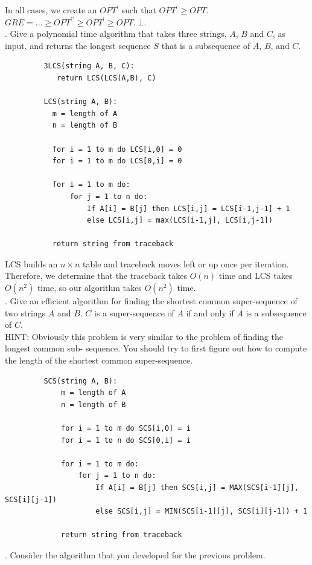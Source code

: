 \documentclass[10pt]{article}
\begin{document}
	In all cases, we create an $OPT^\prime$ such that $OPT^\prime \geq OPT$.\\
	$GRE = \ldots \geq OPT^{\prime\prime} \geq OPT^\prime \geq OPT.~\bot.$
	\\
	
	. Give a polynomial time algorithm that takes three strings, $A$, $B$ and $C$, as input, and returns the
		 longest sequence $S$ that is a subsequence of $A$, $B$, and $C$.\\
		\begin{verbatim}
		 3LCS(string A, B, C):
		    return LCS(LCS(A,B), C)
		
		 LCS(string A, B):
		   m = length of A
		   n = length of B
		
		   for i = 1 to m do LCS[i,0] = 0
		   for i = 1 to m do LCS[0,i] = 0
		   
		   for i = 1 to m do:
		       for j = 1 to n do:
		           If A[i] = B[j] then LCS[i,j] = LCS[i-1,j-1] + 1
		           else LCS[i,j] = max(LCS[i-1,j], LCS[i,j-1])
		            
		   return string from traceback 
		\end{verbatim}
		 LCS builds an $n \times n$ table and traceback moves left or up once per iteration. Therefore, we determine
		 that the traceback takes $O(n)$ time and LCS takes $O(n^2)$ time, so our algorithm takes $O(n^2)$ time.\\ 
		 		 
		 \noindent
		 . Give an efficient algorithm for finding the shortest common super-sequence of two strings $A$ and $B$. $C$
		 is a super-sequence of $A$ if and only if $A$ is a subsequence of $C$.\\
		 HINT: Obviously this problem is very similar to the problem of finding the longest common sub-
		 sequence.   You  should  try  to  first  figure  out  how  to  compute  the  length  of  the  shortest  common
		 super-sequence.
		 \begin{verbatim}
		 SCS(string A, B):
		     m = length of A
		     n = length of B
		     
		     for i = 1 to m do SCS[i,0] = i
		     for i = 1 to n do SCS[0,i] = i
		     
		     for i = 1 to m do:
		         for j = 1 to n do:
		             If A[i] = B[j] then SCS[i,j] = MAX(SCS[i-1][j], SCS[i][j-1])
		             else SCS[i,j] = MIN(SCS[i-1][j], SCS[i][j-1]) + 1
		             
		     return string from traceback
		 \end{verbatim}
		 . Consider the algorithm that you developed for the previous problem.
	
\end{document}
